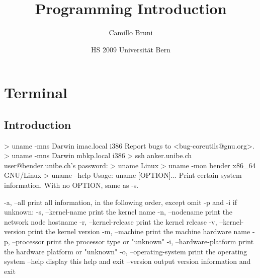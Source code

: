 \documentclass[10pt,a4paper]{scrartcl}
\date{HS 2009 Universität Bern}
\author{Camillo Bruni}
\title{Programming Introduction}
\begin{document}
\section{Terminal}
\subsection{Introduction}
\begin{terminalcode}
> uname -mns
  Darwin imac.local i386
  Report bugs to <bug-coreutils@gnu.org>.
> uname -mns
  Darwin mbkp.local i386
> ssh anker.unibe.ch
  user@bender.unibe.ch's password: 
> uname
  Linux
> uname -mon
  bender x86_64 GNU/Linux
> uname --help
  Usage: uname [OPTION]...
  Print certain system information.  With no OPTION, same as -s.
  
    -a, --all                print all information, in the following order,
                               except omit -p and -i if unknown:
    -s, --kernel-name        print the kernel name
    -n, --nodename           print the network node hostname
    -r, --kernel-release     print the kernel release
    -v, --kernel-version     print the kernel version
    -m, --machine            print the machine hardware name
    -p, --processor          print the processor type or "unknown"
    -i, --hardware-platform  print the hardware platform or "unknown"
    -o, --operating-system   print the operating system
        --help     display this help and exit
        --version  output version information and exit
\end{terminalcode}

\end{document}
